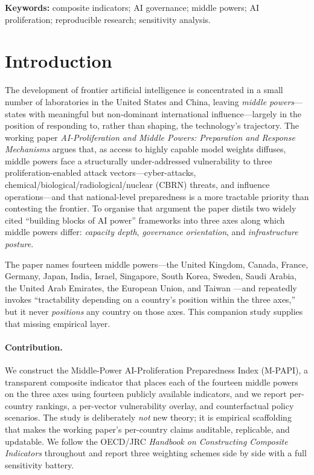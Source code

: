 \documentclass[11pt]{article}
\begin{document}
\noindent\textbf{Keywords:} composite indicators; AI governance; middle powers; AI proliferation; reproducible research; sensitivity analysis.

\tableofcontents

\section{Introduction}
The development of frontier artificial intelligence is concentrated in a small number of laboratories in the United States and China, leaving \emph{middle powers}---states with meaningful but non-dominant international influence---largely in the position of responding to, rather than shaping, the technology's trajectory. The working paper \emph{AI-Proliferation and Middle Powers: Preparation and Response Mechanisms} \citep{teague2026middlepowers} argues that, as access to highly capable model weights diffuses, middle powers face a structurally under-addressed vulnerability to three proliferation-enabled attack vectors---cyber-attacks, chemical/biological/radiological/nuclear (CBRN) threats, and influence operations---and that national-level preparedness is a more tractable priority than contesting the frontier. To organise that argument the paper distils two widely cited ``building blocks of AI power'' frameworks into three axes along which middle powers differ: \emph{capacity depth}, \emph{governance orientation}, and \emph{infrastructure posture}.

The paper names fourteen middle powers---the United Kingdom, Canada, France, Germany, Japan, India, Israel, Singapore, South Korea, Sweden, Saudi Arabia, the United Arab Emirates, the European Union, and Taiwan \citep{wang2024geopolitics}---and repeatedly invokes ``tractability depending on a country's position within the three axes,'' but it never \emph{positions} any country on those axes. This companion study supplies that missing empirical layer.

\paragraph{Contribution.} We construct the Middle-Power AI-Proliferation Preparedness Index (M-PAPI), a transparent composite indicator that places each of the fourteen middle powers on the three axes using fourteen publicly available indicators, and we report per-country rankings, a per-vector vulnerability overlay, and counterfactual policy scenarios. The study is deliberately \emph{not} new theory; it is empirical scaffolding that makes the working paper's per-country claims auditable, replicable, and updatable. We follow the OECD/JRC \emph{Handbook on Constructing Composite Indicators} \citep{oecd2008handbook} throughout and report three weighting schemes side by side with a full sensitivity battery.
\end{document}
